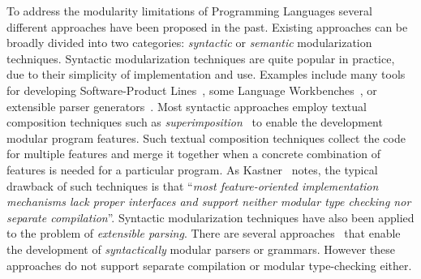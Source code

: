 \begin{comment}
Most programming languages share alot of features in
common. 

For example, most languages have language constructs for:
binding (such as variables, functions, and function applications);
basic arithmetic operations; basic logic and conditional operations;
loops; as well as various other features. For each language construct,
various operations (such as evaluation, compilation, or parsing) need
to be implemented. It is reasonable to wonder whether we can simply
implement those features independently of a particular implementation
of a programming language. Evaluation could be defined independently 
for binding and arithmetic constructs. If the language to be
implemented is the pure lambda calculus, only evaluation of binding 
constructs is necessary. Thus only the component that implements 
evaluation for binding needs to be used in such an implementation.
However, more realistic programming languages 
will include arithmetic constructs, and will require an evaluation
function for those. 


Then it would be possible to \emph{reuse}
some of those features in \emph{multiple} different implementations of
programming languages. Essentially, this would enable a SPL for
programming languages, where all

A solution to the Expression Problem could ena



A concrete 
example that illustrates this issue is 
\end{comment}

To address the modularity limitations of Programming Languages several
different approaches have been proposed in the past. Existing
approaches can be broadly divided into two categories:
\emph{syntactic} or \emph{semantic} modularization
techniques. Syntactic modularization techniques are quite popular in
practice, due to their simplicity of implementation and use. 
Examples include many tools for developing Software-Product
Lines~\cite{}, some Language Workbenches~\cite{}, or extensible parser
generators~\cite{}.  Most syntactic approaches employ textual
composition techniques such as \emph{superimposition}~\cite{} to
enable the development modular program features. Such textual
composition techniques collect the code for multiple features and
merge it together when a concrete combination of features is needed
for a particular program. As Kastner~\cite{} notes, the typical
drawback of such techniques is that
``\emph{most feature-oriented implementation mechanisms lack proper
  interfaces and support neither modular type checking nor separate
  compilation}''. Syntactic modularization techniques have also
been applied to the problem of \emph{extensible parsing}. There are
several approaches~\cite{} that enable the development of
\emph{syntactically} modular parsers or grammars. However these
approaches do not support separate compilation or modular
type-checking either.

